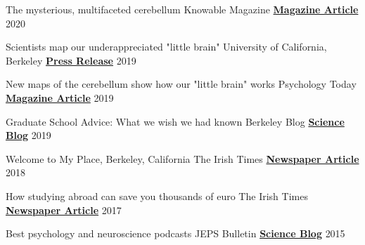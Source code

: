 
\begin{cvhonors}

  \cvhonor
    {The mysterious, multifaceted cerebellum} %
    {Knowable Magazine}
    {\href{https://knowablemagazine.org/article/mind/2020/what-does-the-cerebellum-do}{\textbf{Magazine Article}}}
    {2020}

  \cvhonor
    {Scientists map our underappreciated "little brain"} %
    {University of California, Berkeley}
    {\href{https://news.berkeley.edu/story_jump/cerebellum-map/}{\textbf{Press Release}}}
    {2019}
    
  \cvhonor
    {New maps of the cerebellum show how our "little brain" works} %
    {Psychology Today}
    {\href{ https://www.psychologytoday.com/us/blog/the-athletes-way/201907/new-maps-the-cerebellum-show-how-our-little-brain-works}{\textbf{Magazine Article}}}
    {2019}

  \cvhonor
    {Graduate School Advice: What we wish we had known} %
    {Berkeley Blog}
    {\href{https://psychblog.berkeley.edu/opinion/2019/09/09/Graduate-School-Advice/}{\textbf{Science Blog}}}
    {2019}

  \cvhonor
    {Welcome to My Place, Berkeley, California} %
    {The Irish Times}
    {\href{https://www.irishtimes.com/life-and-style/abroad/welcome-to-my-place-berkeley-california-1.3325991}{\textbf{Newspaper Article}}}
    {2018}
    
  \cvhonor
    {How studying abroad can save you thousands of euro} %
    {The Irish Times}
    {\href{https://www.irishtimes.com/life-and-style/abroad/how-studying-abroad-can-save-you-thousands-of-euro-1.3219467}{\textbf{Newspaper Article}}}
    {2017}
    
  \cvhonor
  	{Best psychology and neuroscience podcasts} %
  	{JEPS Bulletin}
    {\href{https://blog.efpsa.org/2015/09/22/editors-pick-our-favourite-psychology-and-neuroscience-podcasts}{\textbf{Science Blog}}}
    {2015}
    

\end{cvhonors}
